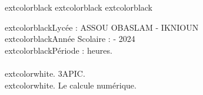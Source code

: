 \documentclass[11pt,a4paper,landscape]{article}
\begin{document}
extcolor{black}{}
\hfill
extcolor{black}{}
\hfill  
extcolor{black}{}
\begin{boxone}
\begin{multicols}{2} 
extcolor{black}{\myfont Lycée :  } {\sffamily  ASSOU OBASLAM - IKNIOUN}
\\
extcolor{black}{\myfont Année Scolaire  :} { - 2024}
\\
extcolor{black}{\myfont Période :} { heures.}
\\
\\
extcolor{white}{.}\qquad\qquad{} {\sffamily 3APIC.}
\\
extcolor{white}{.}\qquad\qquad{} {\sffamily Le calcule numérique.}
\end{multicols}
\end{boxone}
\end{document}
